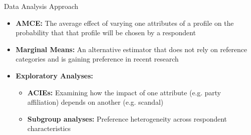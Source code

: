 \documentclass[10pt, aspectratio=169]{beamer}
\newcommand{\customcite}[1]{\textcolor{blue}{\parencite{#1}}}
\begin{document}

 


\begin{frame}{Data Analysis Approach}
    \begin{itemize}
\item \textbf{AMCE:} The average effect of varying one attributes of a profile on the probability that that profile will be chosen by a respondent \customcite{BansakEtAl2022}\vspace{0.3cm} 

\item \textbf{Marginal Means:} An alternative estimator that does not rely on reference categories and is gaining preference in recent research \customcite{Casiraghi} \vspace{0.3cm} 
        \item \textbf{Exploratory Analyses:}  
        \begin{itemize}
            \item \textbf{ACIEs:} Examining how the impact of one attribute (e.g. party affiliation) depends on another (e.g. scandal) \vspace{0.2cm}  
            \item \textbf{Subgroup analyses:} Preference heterogeneity across respondent characteristics \customcite{Leeper_Hobolt_Tilley_2020} \vspace{0.2cm} 
        \end{itemize}
    \end{itemize}
\end{frame}


\end{document}
